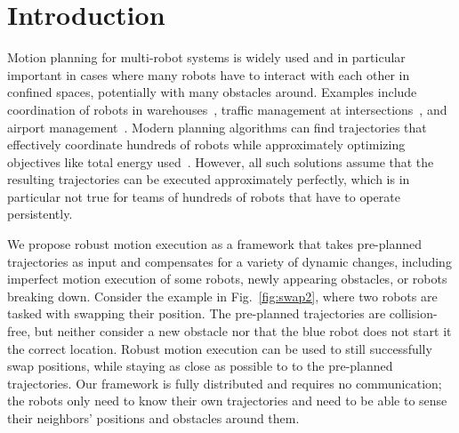 \documentclass{svproc}
\begin{document}
\section{Introduction}
Motion planning for multi-robot systems is widely used and in particular important in cases where many robots have to interact with each other in confined spaces, potentially with many obstacles around.
Examples include coordination of robots in warehouses~\cite{Kiva}, traffic management at intersections~\cite{IntersectionManagementDresner}, and airport management~\cite{AirportTug}.
Modern planning algorithms can find trajectories that effectively coordinate hundreds of robots while approximately optimizing objectives like total energy used~\cite{crazyplanning-ieeetro}.
However, all such solutions assume that the resulting trajectories can be executed approximately perfectly, which is in particular not true for teams of hundreds of robots that have to operate persistently.

We propose robust motion execution as a framework that takes pre-planned trajectories as input and compensates for a variety of dynamic changes, including imperfect motion execution of some robots, newly appearing obstacles, or robots breaking down.
Consider the example in Fig.~\ref{fig:swap2}, where two robots are tasked with swapping their position.
The pre-planned trajectories are collision-free, but neither consider a new obstacle nor that the blue robot does not start it the correct location.
Robust motion execution can be used to still successfully swap positions, while staying as close as possible to to the pre-planned trajectories.
Our framework is fully distributed and requires no communication; the robots only need to know their own trajectories and need to be able to sense their neighbors' positions and obstacles around them.
\end{document}
